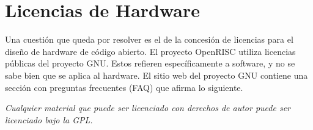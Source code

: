 
	

\section{Licencias de Hardware}

Una cuestión que queda por resolver es el de la concesión de licencias para el diseño de hardware de código abierto. El proyecto OpenRISC utiliza licencias públicas del proyecto GNU. Estos refieren específicamente a software, y no se sabe bien que se aplica al hardware.
El sitio web del proyecto GNU contiene una sección con preguntas frecuentes (FAQ)  que afirma lo siguiente.

\textit{Cualquier material que puede ser licenciado con derechos de autor puede ser licenciado bajo la GPL.}

